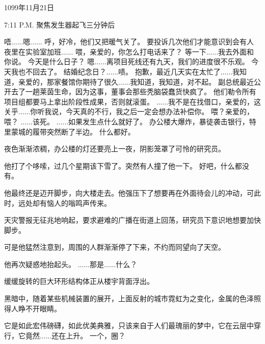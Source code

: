 \documentclass[openany]{book}
\begin{document}
1099年11月21日\par
7:11 P.M. 聚焦发生器起飞三分钟后
\begin{dialogue}
     唔......嗯......
     呼，好冷，他们又把暖气关了。
     要投诉几次他们才能意识到会有人夜里在实验室加班......
     喂，亲爱的，你怎么打电话来了？
     等一下......我去外面和你说。
     今天是什么日子？
     嗯......离项目死线还有九天，我们的进度很不乐观。
     今天我也不回去了。
     结婚纪念日？......啧。
     抱歉，最近几天实在太忙了......我知道，亲爱的，那家餐馆你期待了很久......我知道，我知道，对不起。
     副总统最近公开去了一趟莱茵生命，因为这事，董事会那些秃脑袋蠢货快疯了。
     他们勒令所有项目组都要马上拿出阶段性成果，否则就滚蛋。
     ......我不是在找借口，亲爱的，这关乎......你听我说，今天真的不行，我之后一定会想办法补偿你。
     喂？亲爱的，喂？
     ......该死。
     ......如果发生点什么就好了。
     办公楼大爆炸，暴徒袭击银行，特里蒙城的履带突然断了半边。
     什么都好。\par
    夜色渐渐浓稠，办公楼的灯还要亮上一夜，阴影笼罩了可怜的研究员。\par
    他打了个哆嗦，过几个星期该下雪了。突然有人撞了他一下。
     好吧，什么都没有。\par
    他最终还是迈开脚步，向大楼走去。他强压下了想要再在外面待会儿的冲动，可此时，远处却有恼人的嗡鸣声传来。\par
    天灾警报无征兆地响起，要求避难的广播在街道上回荡，研究员下意识地想要加快脚步。\par
    可是他猛然注意到，周围的人群渐渐停了下来，不约而同望向了天空。\par
    他再次疑惑地抬起头。
     ......那是......什么？\par
    缓缓旋转的巨大环形结构体正从楼宇背面浮出。\par
    黑暗中，随着某些机械装置的展开，上面反射的城市霓虹为之变化，金属的色泽照得人睁不开眼睛。\par
    它是如此宏伟磅礴，如此优美典雅，只该来自于人们最瑰丽的梦中，它在云层中穿行，它竟然......还在上升。
     一个，圈？
\end{dialogue}
\end{document}
